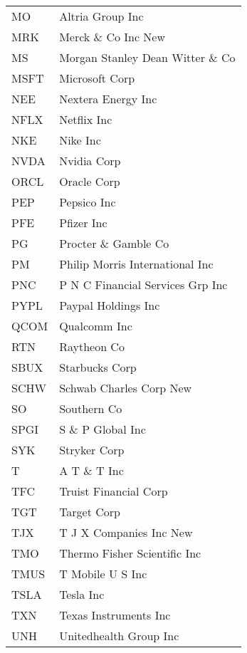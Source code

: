 \begin{tabular}{ll}
MO     &                  Altria Group Inc \\
MRK    &               Merck \& Co Inc New \\
MS     &  Morgan Stanley Dean Witter \& Co \\
MSFT   &                    Microsoft Corp \\
NEE    &                Nextera Energy Inc \\
NFLX   &                       Netflix Inc \\
NKE    &                          Nike Inc \\
NVDA   &                       Nvidia Corp \\
ORCL   &                       Oracle Corp \\
PEP    &                       Pepsico Inc \\
PFE    &                        Pfizer Inc \\
PG     &              Procter \& Gamble Co \\
PM     &   Philip Morris International Inc \\
PNC    &  P N C Financial Services Grp Inc \\
PYPL   &               Paypal Holdings Inc \\
QCOM   &                      Qualcomm Inc \\
RTN    &                       Raytheon Co \\
SBUX   &                    Starbucks Corp \\
SCHW   &           Schwab Charles Corp New \\
SO     &                       Southern Co \\
SPGI   &                 S \& P Global Inc \\
SYK    &                      Stryker Corp \\
T      &                      A T \& T Inc \\
TFC    &             Truist Financial Corp \\
TGT    &                       Target Corp \\
TJX    &           T J X Companies Inc New \\
TMO    &      Thermo Fisher Scientific Inc \\
TMUS   &                  T Mobile U S Inc \\
TSLA   &                         Tesla Inc \\
TXN    &             Texas Instruments Inc \\
UNH    &            Unitedhealth Group Inc \\

\end{tabular}
